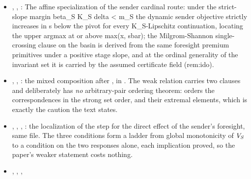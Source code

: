 \begin{itemize}[leftmargin=1.4em,itemsep=1pt]
The exact general-$F$ cardinal route of prop:F-chord-route: the stage gain is compared with $\beta_S K_S$ times the actual distance between the two successor states, so no sanction-coordinate Lipschitz modulus for $F$ is assumed; the transition-adjusted slope condition supplies strict stage monotonicity and dynamic-objective monotonicity, and packages these into the slim MS certificate. The constructor still takes the independently load-bearing fields for monotonicity on the sender invariant set and for the target combined slope condition.
\item {}, , : The affine specialization of the sender cardinal route: under the strict-slope margin beta\_S K\_S delta \textless{} m\_S the dynamic sender objective strictly increases in s below the pivot for every K\_S-Lipschitz continuation, locating the upper argmax at or above max(x, sbar); the Milgrom-Shannon single-crossing clause on the basin is derived from the same foresight premium primitives under a positive stage slope, and at the ordinal generality of the invariant set it is carried by the assumed certificate field (rem:ido).
\item {}, ,
: the mixed
composition after , in
.  The weak relation
carries two clauses and deliberately has \emph{no} arbitrary-pair ordering
theorem:  orders the correspondences in the
strong set order, and  their extremal
elements, which is exactly the caution the text states.
\item {},
,
,
: the localization
of the step for the direct effect of the sender's foresight, same file.  The three conditions form a ladder
from global monotonicity of $V_S$ to a condition on the two responses alone,
each implication proved, so the paper's weaker statement costs nothing.
\item {}, ,
,

\end{itemize}
